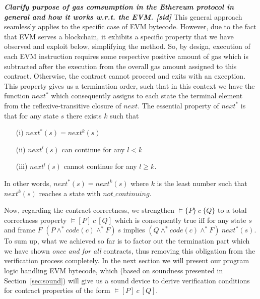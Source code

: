 \documentclass[sigplan,10pt,review]{acmart}\settopmatter{printfolios=true,printccs=false,printacmref=false}
\newcommand{\sconj}{\wedge^*}
\newcommand{\pvalid}[3]{\models\{#1\}\:#2\:\{#3\}}
\newcommand{\tvalid}[3]{\models [#1]\:#2\:[#3]}
\newcommand{\xnext}{\mathit{next}}
\newcommand{\code}[1]{\mathit{code}(#1)}
\newcommand{\ncont}{\mathit{not\_continuing}}
\newcommand{\sid}[1]{\textit{\textbf{#1 [sid]}}}
\begin{document}
\sid{Clarify purpose of gas comsumption in the Ethereum protocol in general and
how it works w.r.t. the EVM.}
This general approach seamlessly applies to the specific case of EVM bytecode. However,
due to the fact that EVM serves a blockchain, it exhibits a specific property that we have observed and exploit below, 
simplifying the method. 
So, by design, execution of each EVM instruction requires some respective positive amount of gas which
is subtracted after the execution from the overall gas amount assigned to this contract. 
Otherwise, the contract cannot proceed and exits with an exception.  
This property gives us a termination order, such that in this context we have the function $\xnext^*$ which 
consequently assigns to each state the terminal element from the reflexive-transitive closure of $\xnext$. 
The essential property of $\xnext^*$ is that for any state $s$ there exists $k$ such that
\begin{itemize}
\item[(i)] $\xnext^*(s) = \xnext^k(s)$
\item[(ii)] $\xnext^l(s)$ can continue for any $l < k$
\item[(iii)] $\xnext^l(s)$ cannot continue for any $l \ge k$.
\end{itemize}
In other words, $\xnext^*(s) = \xnext^k(s)$ where $k$ is the least number such that
$\xnext^k(s)$ reaches a state with $\ncont$. 

Now, regarding the contract correctness, we strengthen $\pvalid{P}{c}{Q}$ to 
a total correctness property $\tvalid{P}{c}{Q}$ which is consequently true iff
for any state $s$ and frame $F$ 
$(P \sconj \code{c} \sconj F)\: s$ implies $(Q \sconj \code{c} \sconj F)\: \xnext^*(s)$. 
To sum up, what we achieved so far is to factor out the termination part which we have 
shown \emph{once and for all} contracts, thus removing this obligation from the verification
process completely. In the next section we will present our program logic handling EVM bytecode, 
which (based on soundness presented in Section~\ref{sec:sound}) will give us 
a sound device to derive verification conditions for contract properties of the form $\tvalid{P}{c}{Q}$.   
%       
\end{document}
